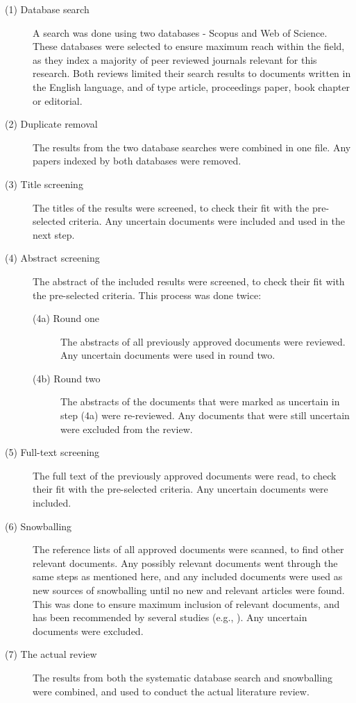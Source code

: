 \begin{description}
    \item[\textnormal{(1)} Database search] A search was done using two databases - Scopus and Web of Science. These databases were selected to ensure maximum reach within the field, as they index a majority of peer reviewed journals relevant for this research. Both reviews limited their search results to documents written in the English language, and of type article, proceedings paper, book chapter or editorial.
    
    \item[\textnormal{(2)} Duplicate removal] The results from the two database searches were combined in one file. Any papers indexed by both databases were removed.
    
    \item[\textnormal{(3)} Title screening] The titles of the results were screened, to check their fit with the pre-selected criteria. Any uncertain documents were included and used in the next step.
    
    \item[\textnormal{(4)} Abstract screening] The abstract of the included results were screened, to check their fit with the pre-selected criteria. This process was done twice:
    \begin{description}
        \item[\textnormal{(4a)} Round one] The abstracts of all previously approved documents were reviewed. Any uncertain documents were used in round two.
        \item[\textnormal{(4b)} Round two] The abstracts of the documents that were marked as uncertain in step (4a) were re-reviewed. Any documents that were still uncertain were excluded from the review.
    \end{description}
    
    \item[\textnormal{(5)} Full-text screening] The full text of the previously approved documents were read, to check their fit with the pre-selected criteria. Any uncertain documents were included.
    
    \item[\textnormal{(6)} Snowballing] The reference lists of all approved documents were scanned, to find other relevant documents. Any possibly relevant documents went through the same steps as mentioned here, and any included documents were used as new sources of snowballing until no new and relevant articles were found. This was done to ensure maximum inclusion of relevant documents, and has been recommended by several studies (e.g., \cite{Greenhalgh_2005,Wohlin_2014}). Any uncertain documents were excluded.
    
    \item[\textnormal{(7)} The actual review] The results from both the systematic database search and snowballing were combined, and used to conduct the actual literature review.
\end{description}

